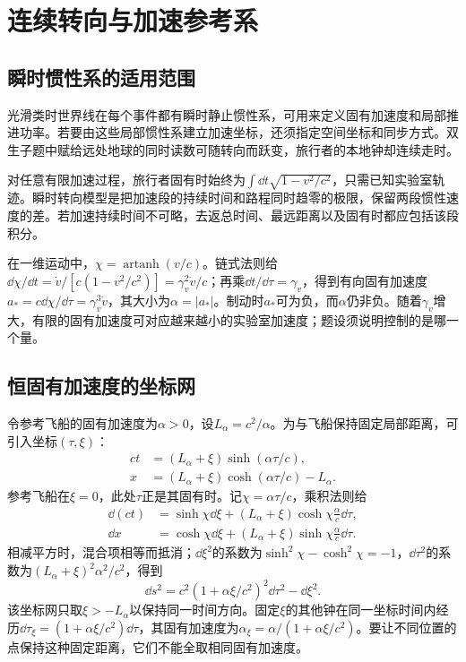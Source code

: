 \section{连续转向与加速参考系}
\subsection{瞬时惯性系的适用范围}
光滑类时世界线在每个事件都有瞬时静止惯性系，可用来定义固有加速度和局部推进功率。若要由这些局部惯性系建立加速坐标，还须指定空间坐标和同步方式。双生子题中赋给远处地球的同时读数可随转向而跃变，旅行者的本地钟却连续走时。

对任意有限加速过程，旅行者固有时始终为$\int\dd t\sqrt{1-v^2/c^2}$，只需已知实验室轨迹。瞬时转向模型是把加速段的持续时间和路程同时趋零的极限，保留两段惯性速度的差。若加速持续时间不可略，去返总时间、最远距离以及固有时都应包括该段积分。

在一维运动中，$\chi=\operatorname{artanh}(v/c)$。链式法则给$\dd\chi/\dd t=\dot v/[c(1-v^2/c^2)]=\gamma_v^2\dot v/c$；再乘$\dd t/\dd\tau=\gamma_v$，得到有向固有加速度$a_*=c\dd\chi/\dd\tau=\gamma_v^3\dot v$，其大小为$\alpha=|a_*|$。制动时$a_*$可为负，而$\alpha$仍非负。随着$\gamma_v$增大，有限的固有加速度可对应越来越小的实验室加速度；题设须说明控制的是哪一个量。

\subsection{恒固有加速度的坐标网}
令参考飞船的固有加速度为$\alpha>0$，设$L_\alpha=c^2/\alpha$。为与飞船保持固定局部距离，可引入坐标$(\tau,\xi)$：
\begin{align*}
 ct&=(L_\alpha+\xi)\sinh(\alpha\tau/c),\\
 x&=(L_\alpha+\xi)\cosh(\alpha\tau/c)-L_\alpha.
\end{align*}
参考飞船在$\xi=0$，此处$\tau$正是其固有时。记$\chi=\alpha\tau/c$，乘积法则给
\begin{align*}
 \dd(ct)&=\sinh\chi\dd\xi
 +(L_\alpha+\xi)\cosh\chi\frac\alpha c\dd\tau,\\
 \dd x&=\cosh\chi\dd\xi
 +(L_\alpha+\xi)\sinh\chi\frac\alpha c\dd\tau.
\end{align*}
相减平方时，混合项相等而抵消；$\dd\xi^2$的系数为$\sinh^2\chi-\cosh^2\chi=-1$，$\dd\tau^2$的系数为$(L_\alpha+\xi)^2\alpha^2/c^2$，得到
\[
 \dd s^2=c^2(1+\alpha\xi/c^2)^2\dd\tau^2-\dd\xi^2.
\]
该坐标网只取$\xi>-L_\alpha$以保持同一时间方向。固定$\xi$的其他钟在同一坐标时间内经历$\dd\tau_\xi=(1+\alpha\xi/c^2)\dd\tau$，其固有加速度为$\alpha_\xi=\alpha/(1+\alpha\xi/c^2)$。要让不同位置的点保持这种固定距离，它们不能全取相同固有加速度。

